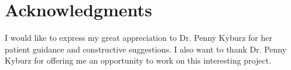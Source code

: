 \chapter*{Acknowledgments}
I would like to express my great appreciation to Dr. Penny Kyburz for her patient guidance and constructive suggestions. I also want to thank Dr. Penny Kyburz for offering me an opportunity to work on this interesting project.
